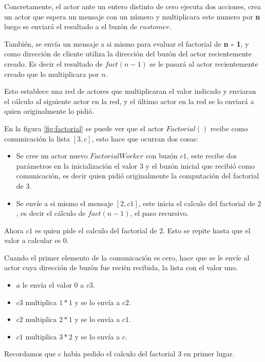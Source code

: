 Concretamente, el actor ante un entero distinto de cero ejecuta dos acciones, crea un actor que espera un mensaje con un número y multiplicara este numero por \textbf{n} luego se enviará el resultado a el buzón de $customer$.

También, se envía un mensaje a si mismo para evaluar el factorial de \textbf{n - 1}, y como dirección de cliente utiliza la dirección del buzón del actor recientemente creado. Es decir el resultado de $fact(n - 1)$ se le pasará al actor recientemente creado que lo multiplicara por $n$.

Esto establece una red de actores que multiplicaran el valor indicado y enviaran el cálculo al siguiente actor en la red, y el último actor en la red se lo enviará a quien originalmente lo pidió.

En la figura \ref{fig:factorial} se puede ver que el actor $Factorial()$ recibe como comunicación la lista $[3,c]$, esto hace que ocurran dos cosas:

\begin{itemize}
\item Se cree un actor nuevo $FactorialWorker$ con buzón $c1$, este recibe dos parámetros en la inicialización el valor $3$ y el buzón inicial que recibió como comunicación, es decir quien pidió originalmente la computación del factorial de $3$.

\item Se envíe a si mismo el mensaje $[2,c1]$, este inicia el calculo del factorial de $2$, es decir el cálculo de $fact(n-1)$, el paso recursivo.
\end{itemize}

Ahora $c1$ es quien pide el calculo del factorial de $2$. Esto se repite hasta que el valor a calcular es $0$.

Cuando el primer elemento de la comunicación es cero, hace que se le envíe al actor cuya dirección de buzón fue recién recibida, la lista con el valor uno. 

\begin{itemize}
\item $a$ le envía el valor $0$ a $c3$.
\item $c3$ multiplica $1*1$ y se lo envía a $c2$.
\item $c2$ multiplica $2*1$ y se lo envía a $c1$.
\item $c1$ multiplica $3*2$ y se lo envía a $c$.
\end{itemize}

Recordamos que $c$ había pedido el calculo del factorial $3$ en primer lugar.

